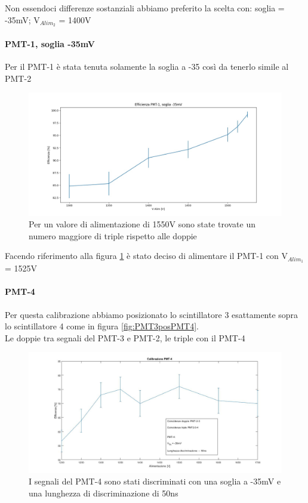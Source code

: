 \documentclass[a4paper]{article}
\begin{document}
Non essendoci differenze sostanziali abbiamo preferito la scelta con: soglia = -35mV; V$_{Alim_2}$ = 1400V

\paragraph{PMT-1, soglia -35mV}
Per il PMT-1 è stata tenuta solamente la soglia a -35 così da tenerlo simile al PMT-2

\begin{figure}[H]
\centering
\includegraphics[scale=0.3]{./immagini/TimeOfFlight/EffPMT135mV}
\caption{Per un valore di alimentazione di 1550V sono state trovate un numero maggiore di triple rispetto alle doppie}
\label{fig:EffPMT135mV}
\end{figure}

Facendo riferimento alla figura \ref{fig:EffPMT135mV} è stato deciso di alimentare il PMT-1 con V$_{Alim_1}$ = 1525V


\paragraph{PMT-4}
\label{sec:CalPMT-4}
Per questa calibrazione abbiamo posizionato lo scintillatore 3 esattamente sopra lo scintillatore 4 come in figura \ref{fig:PMT3posPMT4}.\\
Le doppie tra segnali del PMT-3 e PMT-2, le triple con il PMT-4

\begin{figure}[H]
\centering
\includegraphics[scale=0.25]{./immagini/TimeOfFlight/CoincidenzePMT4.jpg}
\caption{I segnali del PMT-4 sono stati discriminati con una soglia a -35mV e una lunghezza di discriminazione di 50ns}
\label{fig:EffPMT4}
\end{figure}
\end{document}
